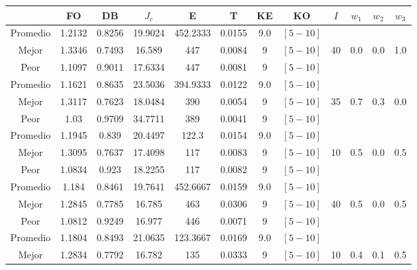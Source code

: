 \begin{table}[h!]
    \footnotesize
    \begin{center}
        \begin{tabular}{|c|c|c|c|c|c|c|c|c|c|c|c|}
        \hline
            & {\bf FO} & {\bf DB} & $J_e$ & {\bf E} & {\bf T} & {\bf KE} & {\bf KO} & $I$ & $w_1$ & $w_2$ & $w_3$ \\
        \hline
        \hline
            Promedio  & 1.2132 & 0.8256 & 19.9024 & 452.2333 & 0.0155 & 9.0 & $[5-10]$ &  &  &  & \\
            \cline{1-8}
            Mejor & 1.3346 & 0.7493  & 16.589 & 447 & 0.0084 & 9 & $[5-10]$ & 40 & 0.0 & 0.0 & 1.0\\
            \cline{1-8}
            Peor & 1.1097 & 0.9011  & 17.6334 & 447 & 0.0081 & 9 & $[5-10]$ &  &  &  & \\
        \hline
        \hline
            Promedio  & 1.1621 & 0.8635 & 23.5036 & 394.9333 & 0.0122 & 9.0 & $[5-10]$ &  &  &  & \\
            \cline{1-8}
            Mejor & 1.3117 & 0.7623  & 18.0484 & 390 & 0.0054 & 9 & $[5-10]$ & 35 & 0.7 & 0.3 & 0.0\\
            \cline{1-8}
            Peor & 1.03 & 0.9709  & 34.7711 & 389 & 0.0041 & 9 & $[5-10]$ &  &  &  & \\
        \hline
        \hline
            Promedio  & 1.1945 & 0.839 & 20.4497 & 122.3 & 0.0154 & 9.0 & $[5-10]$ &  &  &  & \\
            \cline{1-8}
            Mejor & 1.3095 & 0.7637  & 17.4098 & 117 & 0.0083 & 9 & $[5-10]$ & 10 & 0.5 & 0.0 & 0.5\\
            \cline{1-8}
            Peor & 1.0834 & 0.923  & 18.2255 & 117 & 0.0082 & 9 & $[5-10]$ &  &  &  & \\
        \hline
        \hline
            Promedio  & 1.184 & 0.8461 & 19.7641 & 452.6667 & 0.0159 & 9.0 & $[5-10]$ &  &  &  & \\
            \cline{1-8}
            Mejor & 1.2845 & 0.7785  & 16.785 & 463 & 0.0306 & 9 & $[5-10]$ & 40 & 0.5 & 0.0 & 0.5\\
            \cline{1-8}
            Peor & 1.0812 & 0.9249  & 16.977 & 446 & 0.0071 & 9 & $[5-10]$ &  &  &  & \\
        \hline
        \hline
            Promedio  & 1.1804 & 0.8493 & 21.0635 & 123.3667 & 0.0169 & 9.0 & $[5-10]$ &  &  &  & \\
            \cline{1-8}
            Mejor & 1.2834 & 0.7792  & 16.782 & 135 & 0.0333 & 9 & $[5-10]$ & 10 & 0.4 & 0.1 & 0.5\\

\end{tabular}
\end{center}
\end{table}
